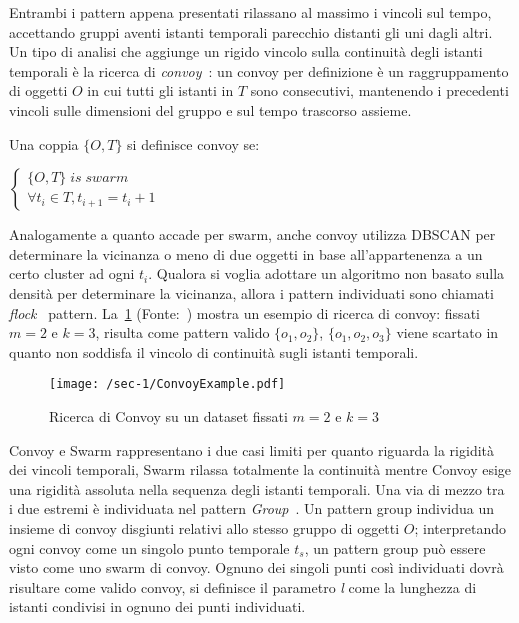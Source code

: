 Entrambi i pattern appena presentati rilassano al massimo i vincoli sul tempo,
accettando gruppi aventi istanti temporali parecchio distanti gli uni dagli altri.
Un tipo di analisi che aggiunge un rigido vincolo sulla continuità degli istanti temporali è
la ricerca di \textit{convoy}~\cite{jeung2008convoy}: un convoy per definizione è un raggruppamento di oggetti \(O\) in cui
tutti gli istanti in \(T\) sono consecutivi, mantenendo i precedenti vincoli sulle dimensioni del
gruppo e sul tempo trascorso assieme.

\begin{definition}[Convoy]\label{definition:convoy}
  Una coppia \( \{ O, T \} \) si definisce convoy se:
  \begin{center}
    \(
      \begin{cases}
         \{ O, T \} \; is \; swarm   \\
      \forall t_{i} \in T, t_{i+1} = t_{i} + 1
      \end{cases}
    \)

  \end{center}
\end{definition}

Analogamente a quanto accade per swarm, anche convoy utilizza DBSCAN per determinare
la vicinanza o meno di due oggetti in base all'appartenenza a un certo cluster ad ogni
\(t_{i}\).
Qualora si voglia adottare un algoritmo non basato sulla densità per determinare la vicinanza, allora i
pattern individuati sono chiamati \textit{flock}~\cite{benkert2008reporting} pattern.
La~\cref{fig:chap-1:ConvoyExample} (Fonte:~\cite{phan2016all}) mostra un esempio di ricerca di convoy: fissati \(m=2\)
e \(k=3\), risulta come pattern valido \( \{ o_{1}, o_{2}\} \),
\( \{ o_{1}, o_{2}, o_{3}\} \) viene scartato in quanto non soddisfa il vincolo di continuità
sugli istanti temporali.

\begin{figure}
  \centering
  \texttt{[image: /sec-1/ConvoyExample.pdf]}
  \caption{Ricerca di Convoy su un dataset fissati \(m=2\) e \(k=3\)}%
  \label{fig:chap-1:ConvoyExample}
\end{figure}

Convoy e Swarm rappresentano i due casi limiti per quanto riguarda la rigidità dei vincoli temporali,
Swarm rilassa totalmente la continuità mentre Convoy esige una rigidità assoluta nella sequenza
degli istanti temporali.
Una via di mezzo tra i due estremi è individuata nel pattern \textit{Group}~\cite{wang2006efficient}.
Un pattern group individua un insieme di convoy disgiunti relativi allo stesso gruppo di oggetti \(O\);
interpretando ogni convoy come un singolo punto temporale \(t_{s}\), un pattern group può essere visto come uno swarm
di convoy.
Ognuno dei singoli punti così individuati dovrà risultare come valido convoy, si definisce
il parametro \textit{l} come la lunghezza di istanti condivisi in ognuno dei punti individuati.

